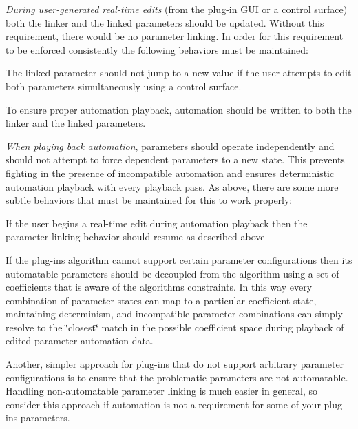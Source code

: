 {\itshape During user-\/generated real-\/time edits} (from the plug-\/in G\+U\+I or a control surface) both the linker and the linked parameters should be updated. Without this requirement, there would be no parameter linking. In order for this requirement to be enforced consistently the following behaviors must be maintained\+: 
\begin{DoxyItemize}
\item The linked parameter should not jump to a new value if the user attempts to edit both parameters simultaneously using a control surface.  
\item To ensure proper automation playback, automation should be written to both the linker and the linked parameters.  
\end{DoxyItemize}

{\itshape When playing back automation}, parameters should operate independently and should not attempt to force dependent parameters to a new state. This prevents fighting in the presence of incompatible automation and ensures deterministic automation playback with every playback pass. As above, there are some more subtle behaviors that must be maintained for this to work properly\+: 
\begin{DoxyItemize}
\item If the user begins a real-\/time edit during automation playback then the parameter linking behavior should resume as described above  
\item If the plug-\/in\textquotesingle{}s algorithm cannot support certain parameter configurations then its automatable parameters should be decoupled from the algorithm using a set of coefficients that is aware of the algorithm\textquotesingle{}s constraints. In this way every combination of parameter states can map to a particular coefficient state, maintaining determinism, and incompatible parameter combinations can simply resolve to the \char`\"{}closest\char`\"{} match in the possible coefficient space during playback of edited parameter automation data. 
\item Another, simpler approach for plug-\/ins that do not support arbitrary parameter configurations is to ensure that the problematic parameters are not automatable. Handling non-\/automatable parameter linking is much easier in general, so consider this approach if automation is not a requirement for some of your plug-\/in\textquotesingle{}s parameters.  
\end{DoxyItemize}

